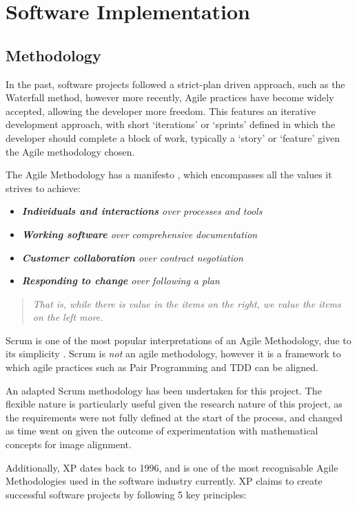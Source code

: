 \section{Software Implementation}

\subsection{Methodology}

In the past, software projects followed a strict-plan driven approach, such as the Waterfall method, however more recently, Agile practices have become widely accepted, allowing the developer more freedom. This features an iterative development approach, with short `iterations' or `sprints' defined in which the developer should complete a block of work, typically a `story' or `feature' given the Agile methodology chosen.

The Agile Methodology has a manifesto \cite{Manifesto}, which encompasses all the values it strives to achieve:
\begin{itemize}
  \item \textit{\textbf{Individuals and interactions} over processes and tools}
  \item \textit{\textbf{Working software} over comprehensive documentation}
  \item \textit{\textbf{Customer collaboration} over contract negotiation}
  \item \textit{\textbf{Responding to change} over following a plan}
\end{itemize}

\begin{quotation}
  \textit{That is, while there is value in the items on the right, we value the items on the left more.}
\end{quotation}

Scrum is one of the most popular interpretations of an Agile Methodology, due to its simplicity \cite{scrum}. Scrum is \textit{not} an agile methodology, however it is a framework to which agile practices such as Pair Programming and \acrfull{TDD} can be aligned.

An adapted Scrum methodology has been undertaken for this project. The flexible nature is particularly useful given the research nature of this project, as the requirements were not fully defined at the start of the process, and changed as time went on given the outcome of experimentation with mathematical concepts for image alignment.

Additionally, \acrfull{XP} \cite{xp} dates back to 1996, and is one of the most recognisable Agile Methodologies used in the software industry currently. \acrshort{XP} claims to create successful software projects by following 5 key principles:

